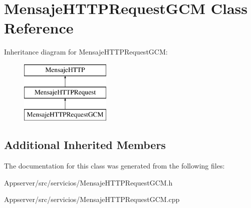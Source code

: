 \hypertarget{classMensajeHTTPRequestGCM}{}\section{Mensaje\+H\+T\+T\+P\+Request\+G\+CM Class Reference}
\label{classMensajeHTTPRequestGCM}
Inheritance diagram for Mensaje\+H\+T\+T\+P\+Request\+G\+CM\+:\begin{figure}[H]
\begin{center}
\leavevmode
\includegraphics[height=3.000000cm]{classMensajeHTTPRequestGCM}
\end{center}
\end{figure}
\subsection*{Additional Inherited Members}


The documentation for this class was generated from the following files\+:\begin{DoxyCompactItemize}
\item 
Appserver/src/servicios/Mensaje\+H\+T\+T\+P\+Request\+G\+C\+M.\+h\item 
Appserver/src/servicios/Mensaje\+H\+T\+T\+P\+Request\+G\+C\+M.\+cpp\end{DoxyCompactItemize}
